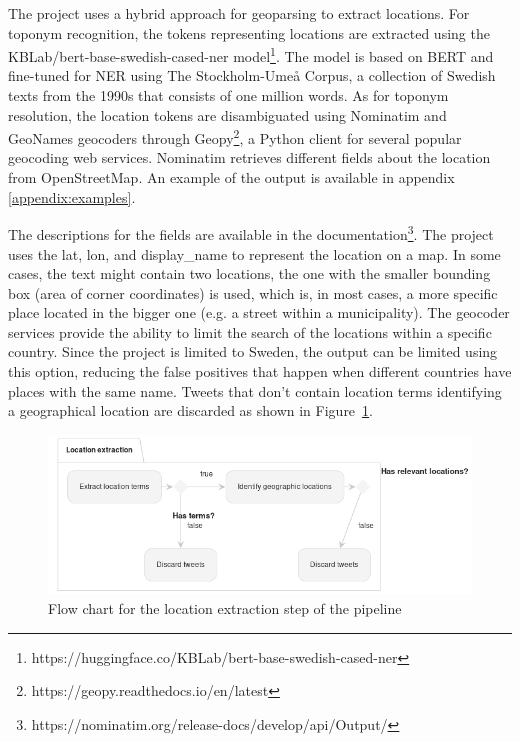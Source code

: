 The project uses a hybrid approach for geoparsing to extract locations. For toponym recognition, the
tokens representing locations are extracted using the KBLab/bert-base-swedish-cased-ner
model\footnote{https://huggingface.co/KBLab/bert-base-swedish-cased-ner}. The model is based on BERT
and fine-tuned for \ac{NER} using The Stockholm-Umeå Corpus, a collection of Swedish texts from the
1990s that consists of one million words. As for toponym resolution, the location tokens are
disambiguated using Nominatim and GeoNames geocoders through
Geopy\footnote{https://geopy.readthedocs.io/en/latest}, a Python client for several
popular geocoding web services. Nominatim retrieves different fields about the
location from OpenStreetMap. An example of the output is available in appendix
\ref{appendix:examples}.

  
The descriptions for the fields are available in the
documentation\footnote{https://nominatim.org/release-docs/develop/api/Output/}. The project uses
the lat, lon, and display\_name to represent the location on a map. In some cases, the text might
contain two locations, the one with the smaller bounding box (area of corner coordinates) is used,
which is, in most cases, a more specific place located in the bigger one (e.g. a street within a
municipality). The geocoder services provide the ability to limit the search of the locations
within a specific country. Since the project is limited to Sweden, the output can be limited using
this option, reducing the false positives that happen when different countries have places with
the same name. Tweets that don't contain location terms identifying a geographical
location are discarded as shown in Figure~\ref{fig:flow_chart_location_extraction}.

\begin{figure}[H]
\begin{center}
  \includegraphics[width=\columnwidth]{./images/location_extraction.png}
\end{center}
\caption{Flow chart for the location extraction step of the pipeline}
\label{fig:flow_chart_location_extraction}
\end{figure}


